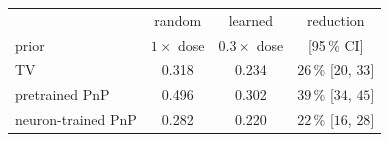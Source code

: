 \begin{tabular}{@{}l c c c@{}}\toprule
& random & learned & reduction\\
prior & $1\times$ dose & $0.3\times$ dose & [95\,\% CI]\\\midrule
TV & 0.318 & 0.234 & $26$\,\% [$20$, $33$]\\
pretrained PnP & 0.496 & 0.302 & $39$\,\% [$34$, $45$]\\
neuron-trained PnP & 0.282 & 0.220 & $22$\,\% [$16$, $28$]\\
\bottomrule\end{tabular}
